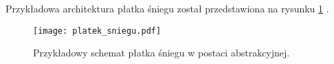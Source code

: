 Przykładowa architektura płatka śniegu został przedstawiona na rysunku \ref{fig:platek_sniegu} .

\begin{center}
\begin{figure}[H]
  \begin{center}
    \texttt{[image: platek\_sniegu.pdf]}
  \end{center}
  \caption{Przykładowy schemat płatka śniegu w postaci abstrakcyjnej. }
    \label{fig:platek_sniegu}
\end{figure}
\end{center}







\begin{comment}
 
\end{comment}
